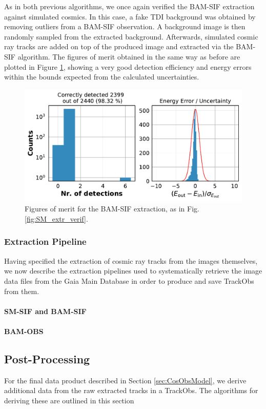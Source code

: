 \documentclass[a4paper, 11pt]{article}
\begin{document}
As in both previous algorithms, we once again verified the BAM-SIF extraction against simulated cosmics. In this case, a fake TDI background was obtained by removing outliers from a BAM-SIF observation. A background image is then randomly sampled from the extracted background. Afterwards, simulated cosmic ray tracks are added on top of the produced image and extracted via the BAM-SIF algorithm. The figures of merit obtained in the same way as before are plotted in Figure \ref{fig:BAM-SIF_extr_verif}, showing a very good detection efficiency and energy errors within the bounds expected from the calculated uncertainties.
\begin{figure}
  \centering
    \includegraphics[width=\textwidth]{images/extraction/verification_bam-sif}
    \caption{Figures of merit for the BAM-SIF extraction, as in Fig. \ref{fig:SM_extr_verif}.}
  \label{fig:BAM-SIF_extr_verif}
\end{figure}


\subsubsection{Extraction Pipeline}

Having specified the extraction of cosmic ray tracks from the images themselves, we now describe the  extraction pipelines used to systematically retrieve the image data files from the Gaia Main Database in order to produce and save TrackObs from them.

\paragraph{SM-SIF and BAM-SIF}
\paragraph{BAM-OBS}
\subsection{Post-Processing}
\label{sec:postprocessing}
For the final data product described in Section \ref{sec:CosObsModel}, we derive additional data from the raw extracted tracks in a TrackObs. The algorithms for deriving these are outlined in this section
\end{document}
